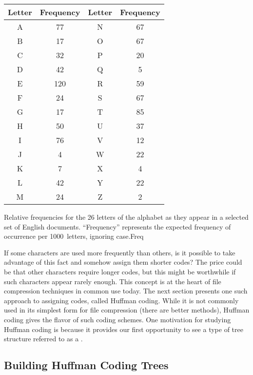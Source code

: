 \begin{mytable}
\begin{center}
\begin{tabular}{c|c||c|c}
\multicolumn{1}{c}{\textbf{Letter}} &
\multicolumn{1}{|c||}{\textbf{Frequency}} &
\multicolumn{1}{c}{\textbf{Letter}} &
\multicolumn{1}{|c}{\textbf{Frequency}}\\
\hline
A & 77 & N & 67\\
B & 17 & O & 67\\
C & 32 & P & 20\\
D & 42 & Q &  5\\
E &120 & R & 59\\
F & 24 & S & 67\\
G & 17 & T & 85\\
H & 50 & U & 37\\
I & 76 & V & 12\\
J &  4 & W & 22\\
K &  7 & X &  4\\
L & 42 & Y & 22\\
M & 24 & Z &  2\\
\end{tabular}
\end{center}
\vspace{-\medskipamount}

{Relative frequencies for the 26 letters of the alphabet as they
appear in a selected set of English documents.
``Frequency'' represents the expected frequency of occurrence per
1000~letters, ignoring case.}{Freq}
\medskip
\end{mytable}

If some characters are used more frequently than others, is
it possible to take advantage of this fact and somehow assign them
shorter codes?
The price could be that other characters require longer codes, but
this might be worthwhile if such characters appear rarely enough.
This concept is at the heart of file compression techniques in common
use today.
The next section presents one such approach to assigning
 codes, called Huffman coding.
While it is not commonly used in its simplest form for file
compression (there are better methods), Huffman coding gives
the flavor of such coding schemes.
One motivation for studying Huffman coding is because it provides our
first opportunity to see a type of tree structure referred to as a
.

\subsection{Building Huffman Coding Trees}
\label{HuffBuildSec}

